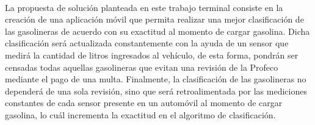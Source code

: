 \paragraph{}
La propuesta de solución planteada en este trabajo terminal consiste en la creación de una aplicación móvil que permita realizar una mejor clasificación de las gasolineras de acuerdo con su exactitud al momento de cargar gasolina. Dicha clasificación será actualizada constantemente con la ayuda de un sensor que medirá la cantidad de litros ingresados al vehículo, de esta forma, pondrán ser censadas todas aquellas gasolineras que evitan una revisión de la Profeco mediante el pago de una multa. Finalmente, la clasificación de las gasolineras no dependerá de una sola revisión, sino que será retroalimentada por las mediciones constantes de cada sensor presente en un automóvil al momento de cargar gasolina, lo cuál incrementa la exactitud en el algoritmo de clasificación.